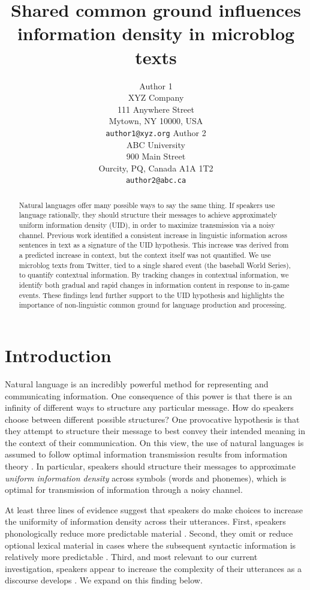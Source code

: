 \documentclass[11pt,letterpaper]{article}
\title{Shared common ground influences information density in microblog texts\Thanks{Thanks to...}}
\author{Author 1\\
XYZ Company\\
111 Anywhere Street\\
Mytown, NY 10000, USA\\
{\tt author1@xyz.org}
	  \And
          Author 2\\
ABC University\\
900 Main Street\\
Ourcity, PQ, Canada A1A 1T2\\
{\tt author2@abc.ca}
}
\date{}
\begin{document}
\maketitle
\begin{abstract}
Natural languages offer many possible ways to say the same thing. If speakers use language rationally, they should structure their messages to achieve approximately uniform information density (UID), in order to maximize transmission via a noisy channel. Previous work identified a consistent increase in linguistic information across sentences in text as a signature of the UID hypothesis. This increase was derived from a predicted increase in context, but the context itself was not quantified. We use microblog texts from Twitter, tied to a single shared event (the baseball World Series), to quantify contextual information. By tracking changes in contextual information, we identify both gradual and rapid changes in information content in response to in-game events. These findings lend further support to the UID hypothesis and highlights the importance of non-linguistic common ground for language production and processing.
\end{abstract}

\section{Introduction}

Natural language is an incredibly powerful method for representing and communicating information. One consequence of this power is that there is an infinity of different ways to structure any particular message. How do speakers choose between different possible structures? One provocative hypothesis is that they attempt to structure their message to best convey their intended meaning in the context of their communication. On this view, the use of natural languages is assumed to follow optimal information transmission results from information theory \cite{shannon1948}. In particular, speakers should structure their messages to approximate \emph{uniform information density} across symbols (words and phonemes), which is optimal for transmission of information through a noisy channel. 

At least three lines of evidence suggest that speakers do make choices to increase the uniformity of information density across their utterances. First, speakers phonologically reduce more predictable material \cite{aylett2004,aylett2006,bell2003}. Second, they omit or reduce optional lexical material in cases where the subsequent syntactic information is relatively more predictable \cite{levy2007,frank2008,jaeger2010}. Third, and most relevant to our current investigation, speakers appear to increase the complexity of their utterances as a discourse develops \cite{genzel2002,genzel2003,qian2012}. We expand on this finding below.
\end{document}
